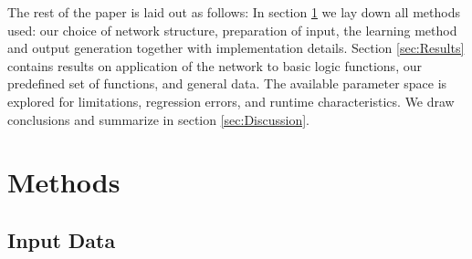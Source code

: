 \documentclass[useAMS,usenatbib]{templates/mn2e}
\begin{document}
The rest of the paper is laid out as follows: In section
\ref{sec:Methods} we lay down all methods used: our choice of network
structure, preparation of input, the learning method and output
generation together with implementation details. Section
\ref{sec:Results} contains results on application of the network to
basic logic functions, our predefined set of functions, and general
data. The available parameter space is explored for limitations,
regression errors, and runtime characteristics. We draw conclusions
and summarize in section \ref{sec:Discussion}.

\section{Methods}
\label{sec:Methods}
\subsection{Input Data}
\end{document}
